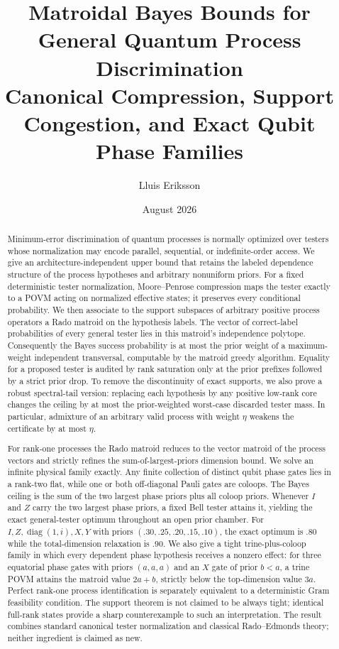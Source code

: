 \documentclass[11pt]{article}
\title{\textbf{Matroidal Bayes Bounds for General Quantum Process Discrimination}\\
Canonical Compression, Support Congestion, and Exact Qubit Phase Families}
\author{Lluis Eriksson}
\date{August 2026}
\theoremstyle{definition}
\theoremstyle{remark}
\begin{document}
\maketitle

\begin{abstract}
Minimum-error discrimination of quantum processes is normally optimized over
testers whose normalization may encode parallel, sequential, or
indefinite-order access.  We give an architecture-independent upper bound that
retains the labeled dependence structure of the process hypotheses and
arbitrary nonuniform priors.  For a fixed deterministic tester normalization,
Moore--Penrose compression maps the tester exactly to a POVM acting on
normalized effective states; it preserves every conditional probability.  We
then associate to the support subspaces of arbitrary positive process
operators a Rado matroid on the hypothesis labels.  The vector of
correct-label probabilities of every general tester lies in this matroid's
independence polytope.  Consequently the Bayes success probability is at most
the prior weight of a maximum-weight independent transversal, computable by
the matroid greedy algorithm.  Equality for a proposed tester is audited by
rank saturation only at the prior prefixes followed by a strict prior drop.
To remove the discontinuity of exact supports, we also prove a robust
spectral-tail version: replacing each hypothesis by any positive low-rank
core changes the ceiling by at most the prior-weighted worst-case discarded
tester mass.  In particular, admixture of an arbitrary valid process with
weight $\eta$ weakens the certificate by at most $\eta$.

For rank-one processes the Rado matroid reduces to the vector matroid of the
process vectors and strictly refines the sum-of-largest-priors dimension
bound.  We solve an infinite physical family exactly.  Any finite collection
of distinct qubit phase gates lies in a rank-two flat, while one or both
off-diagonal Pauli gates are coloops.  The Bayes ceiling is the sum of the two
largest phase priors plus all coloop priors.  Whenever $I$ and $Z$ carry the
two largest phase priors, a fixed Bell tester attains it, yielding the exact
general-tester optimum throughout an open prior chamber.  For
$I,Z,\operatorname{diag}(1,i),X,Y$ with priors $(.30,.25,.20,.15,.10)$, the
exact optimum is $.80$ while the total-dimension relaxation is $.90$.
We also give a tight trine-plus-coloop family in which every dependent phase
hypothesis receives a nonzero effect: for three equatorial phase gates with
priors $(a,a,a)$ and an $X$ gate of prior $b<a$, a trine POVM attains the
matroid value $2a+b$, strictly below the top-dimension value $3a$.
Perfect rank-one process identification is separately equivalent to a
deterministic Gram feasibility condition.  The support theorem is not claimed to be always tight;
identical full-rank states provide a sharp counterexample to such an
interpretation.  The result combines standard canonical tester normalization
and classical Rado--Edmonds theory; neither ingredient is claimed as new.
\end{abstract}
\end{document}
